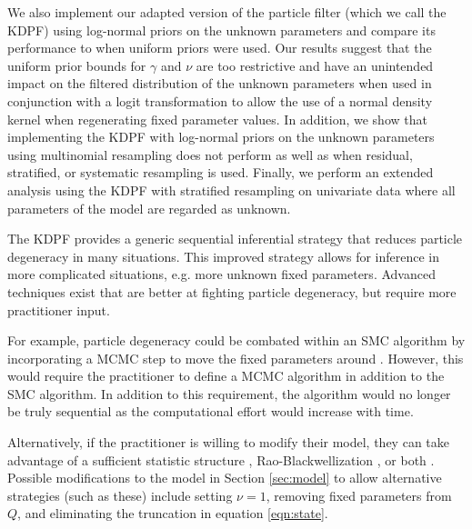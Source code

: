 We also implement our adapted version of the \citet{Liu:West:comb:2001} particle filter (which we call the KDPF) using log-normal priors on the unknown parameters and compare its performance to when uniform priors were used. Our results suggest that the uniform prior bounds for $\gamma$ and $\nu$ are too restrictive and have an unintended impact on the filtered distribution of the unknown parameters when used in conjunction with a logit transformation to allow the use of a normal density kernel when regenerating fixed parameter values. In addition, we show that implementing the KDPF with log-normal priors on the unknown parameters using multinomial resampling does not perform as well as when residual, stratified, or systematic resampling is used. Finally, we perform an extended analysis using the KDPF with stratified resampling on univariate data where all parameters of the model are regarded as unknown.

The KDPF provides a generic sequential inferential strategy that reduces particle degeneracy in many situations. This improved strategy allows for inference in more complicated situations, e.g. more unknown fixed parameters. Advanced techniques exist that are better at fighting particle degeneracy, but require more practitioner input.

For example, particle degeneracy could be combated within an SMC algorithm by incorporating a MCMC step to move the fixed parameters around \citep{Gilk:Berz:foll:2001,Stor:part:2002}. However, this would require the practitioner to define a MCMC algorithm in addition to the SMC algorithm. In addition to this requirement, the algorithm would no longer be truly sequential as the computational effort would increase with time.

Alternatively, if the practitioner is willing to modify their model, they can take advantage of a sufficient statistic structure \citep{Fear:mark:2002}, Rao-Blackwellization \citep{Douc:Gods:Andr:on:2000}, or both \citep{carvalho2010particle}. Possible modifications to the model in Section \ref{sec:model} to allow alternative strategies (such as these) include setting $\nu=1$, removing fixed parameters from $Q$, and eliminating the truncation in equation \eqref{eqn:state}.